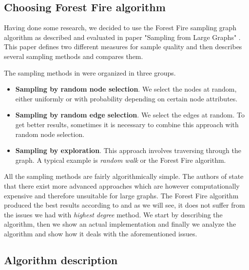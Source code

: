 \subsection{Choosing Forest Fire algorithm}

Having done some 
research, we decided to use the Forest Fire sampling graph algorithm as described and evaluated in paper "Sampling from Large Graphs" \cite{leskovec2006sampling}. This paper defines two different measures for sample quality and then describes several sampling methods and compares them.

The sampling methods in \cite{leskovec2006sampling} were organized in three groups.

\begin{itemize}
\item \textbf{Sampling by random node selection}. We select the nodes at random, either uniformly or with probability depending on certain node attributes.
\item \textbf{Sampling by random edge selection}. We select the edges at random. To get better results, sometimes it is necessary to combine this approach with random node selection.
\item \textbf{Sampling by exploration}. This approach involves traversing through the graph. A typical example is \emph{random walk} or the Forest Fire algorithm.
\end{itemize}

All the sampling methods are fairly algorithmically simple. The authors of \cite{leskovec2006sampling} state that there exist more advanced approaches which are however computationally expensive and therefore unsuitable for large graphs. The Forest Fire algorithm produced the best results according to \cite{leskovec2006sampling} and as we will see, it does not suffer from the issues we had with \emph{highest degree} method. We start by describing the algorithm, then we show an actual implementation and finally we analyze the algorithm and show how it deals with the aforementioned issues.

\subsection{Algorithm description}

